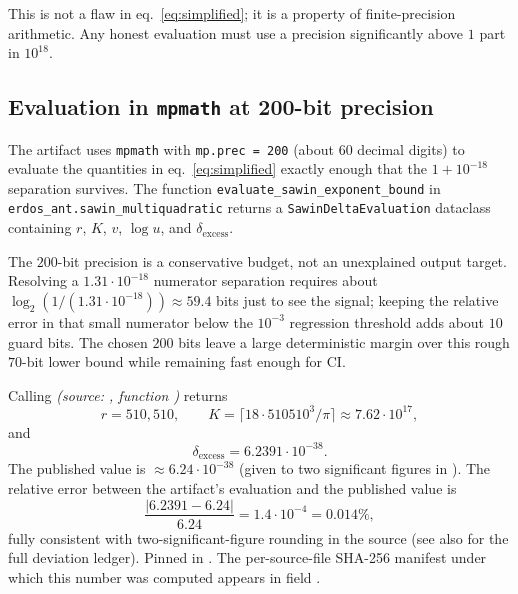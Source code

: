 This is not a flaw in eq.~\eqref{eq:simplified}; it is a property of
finite-precision arithmetic. Any honest evaluation must use a precision
significantly above $1$ part in $10^{18}$.

\subsection{Evaluation in \texttt{mpmath} at 200-bit precision}

The artifact uses \texttt{mpmath} \cite{mpmath} with
\texttt{mp.prec = 200} (about 60 decimal digits) to evaluate the
quantities in eq.~\eqref{eq:simplified} exactly enough that the
$1 + 10^{-18}$ separation survives. The function
\texttt{evaluate\_sawin\_exponent\_bound} in
\texttt{erdos\_ant.sawin\_multiquadratic} returns a
\texttt{SawinDeltaEvaluation} dataclass containing $r$, $K$, $v$,
$\log u$, and $\delta_{\text{excess}}$.

The $200$-bit precision is a conservative budget, not an unexplained
output target. Resolving a $1.31 \cdot 10^{-18}$ numerator separation
requires about $\log_2(1/(1.31 \cdot 10^{-18})) \approx 59.4$ bits just
to see the signal; keeping the relative error in that small numerator
below the $10^{-3}$ regression threshold adds about $10$ guard bits.
The chosen $200$ bits leave a large deterministic margin over this
rough $70$-bit lower bound while remaining fast enough for CI.

\begin{verification}\label{ver:eq22_reproduction}
Calling 
\textit{(source: ,
function )} returns
\[
  r = 510{,}510, \qquad
  K = \lceil 18 \cdot 510510^3 / \pi \rceil \approx 7.62 \cdot 10^{17},
\]
and
\[
  \delta_{\text{excess}}
  = 6.2391 \cdot 10^{-38}.
\]
The published value is $\approx 6.24 \cdot 10^{-38}$ (given to two
significant figures in \cite{Sawin2026Remarks}). The relative error
between the artifact's evaluation and the published value is
\[
  \frac{|6.2391 - 6.24|}{6.24} = 1.4 \cdot 10^{-4} = 0.014\%,
\]
fully consistent with two-significant-figure rounding in the source
(see also  for the full deviation
ledger).
Pinned in
.
The per-source-file SHA-256 manifest under which this number was
computed appears in
 field
.
\end{verification}

